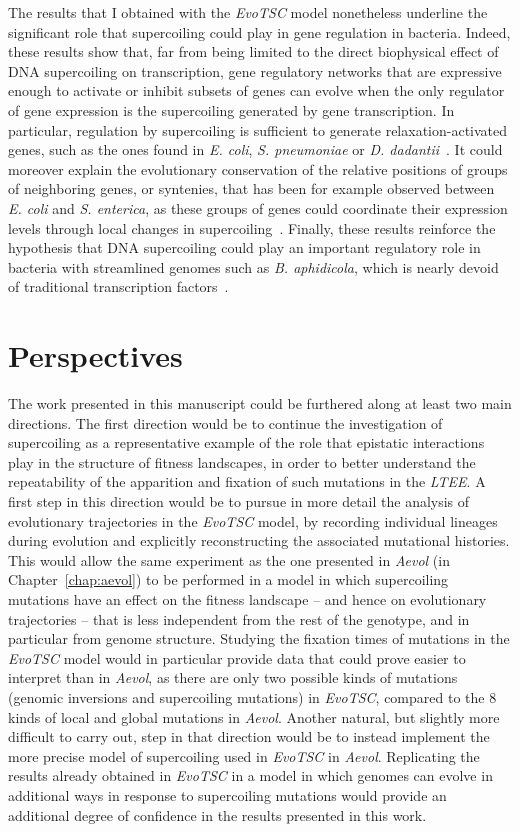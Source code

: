 The results that I obtained with the \emph{EvoTSC} model nonetheless underline the significant role that supercoiling could play in gene regulation in bacteria.
Indeed, these results show that, far from being limited to the direct biophysical effect of DNA supercoiling on transcription, gene regulatory networks that are expressive enough to activate or inhibit subsets of genes can evolve when the only regulator of gene expression is the supercoiling generated by gene transcription.
In particular, regulation by supercoiling is sufficient to generate relaxation-activated genes, such as the ones found in \emph{E. coli}, \emph{S. pneumoniae} or \emph{D. dadantii}~\citep{peter2004,ferrandiz2010,pineau2022a}.
It could moreover explain the evolutionary conservation of the relative positions of groups of neighboring genes, or syntenies, that has been for example observed between \emph{E. coli} and \emph{S. enterica}, as these groups of genes could coordinate their expression levels through local changes in supercoiling~\citep{junier2016}.
Finally, these results reinforce the hypothesis that DNA supercoiling could play an important regulatory role in bacteria with streamlined genomes such as \emph{B. aphidicola}, which is nearly devoid of traditional transcription factors~\citep{brinza2013}.


\section{Perspectives}

The work presented in this manuscript could be furthered along at least two main directions.
The first direction would be to continue the investigation of supercoiling as a representative example of the role that epistatic interactions play in the structure of fitness landscapes, in order to better understand the repeatability of the apparition and fixation of such mutations in the \emph{LTEE}.
A first step in this direction would be to pursue in more detail the analysis of evolutionary trajectories in the \emph{EvoTSC} model, by recording individual lineages during evolution and explicitly reconstructing the associated mutational histories.
This would allow the same experiment as the one presented in \emph{Aevol} (in Chapter~\ref{chap:aevol}) to be performed in a model in which supercoiling mutations have an effect on the fitness landscape -- and hence on evolutionary trajectories -- that is less independent from the rest of the genotype, and in particular from genome structure.
Studying the fixation times of mutations in the \emph{EvoTSC} model would in particular provide data that could prove easier to interpret than in \emph{Aevol}, as there are only two possible kinds of mutations (genomic inversions and supercoiling mutations) in \emph{EvoTSC}, compared to the 8 kinds of local and global mutations in \emph{Aevol}.
Another natural, but slightly more difficult to carry out, step in that direction would be to instead implement the more precise model of supercoiling used in \emph{EvoTSC} in \emph{Aevol}.
Replicating the results already obtained in \emph{EvoTSC} in a model in which genomes can evolve in additional ways in response to supercoiling mutations would provide an additional degree of confidence in the results presented in this work.

